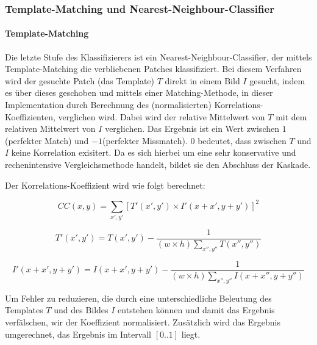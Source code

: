 
	\subsubsection{Template-Matching und Nearest-Neighbour-Classifier}

	\paragraph{Template-Matching}
	Die letzte Stufe des Klassifizierers ist ein Nearest-Neighbour-Classifier, der mittels Template-Matching die verbliebenen Patches klassifiziert. Bei diesem Verfahren wird der gesuchte Patch (das Template) $T$ direkt in einem Bild $I$ gesucht, indem es über dieses geschoben und mittels einer Matching-Methode, in dieser Implementation durch Berechnung des (normalisierten) Korrelations-Koeffizienten, verglichen wird. Dabei wird der relative Mittelwert von $T$ mit dem relativen Mittelwert von $I$ verglichen. Das Ergebnis ist ein Wert zwischen $1$(perfekter Match) und $-1$(perfekter Missmatch). $0$ bedeutet, dass zwischen $T$ und $I$ keine Korrelation exisitert. Da es sich hierbei um eine sehr konservative und rechenintensive Vergleichsmethode handelt, bildet sie den Abschluss der Kaskade.

	Der Korrelations-Koeffizient wird wie folgt berechnet:

	\begin{equation}
	CC(x,y)=\underset{x',y'}{\sum}[T'(x',y')\times I'(x+x',y+y')]^{2}
	\end{equation}


	\begin{equation}
	T'(x',y')=T(x',y')-\frac{1}{(w\times h)\underset{x'',y''}{\sum}T(x'',y'')}
	\end{equation}


	\begin{equation}
	I'(x+x',y+y')=I(x+x',y+y')-\frac{1}{(w\times h)\underset{x'',y''}{\sum}I(x+x'',y+y'')}
	\end{equation}


	Um Fehler zu reduzieren, die durch eine unterschiedliche Beleutung
	des Templates $T$ und des Bildes $I$ entstehen können und damit
	das Ergebnis verfälschen, wir der Koeffizient normalisiert. Zusätzlich
	wird das Ergebnis umgerechnet, das Ergebnis im Intervall $[0..1]$
	liegt.

